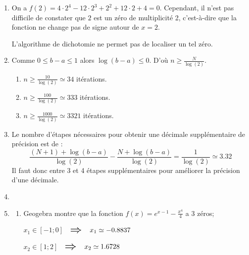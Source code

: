 \documentclass[11pt,a4paper,twoside]{report}
\begin{document}
\begin{enumerate}[label=R4.\arabic*, font=\bfseries, itemsep=8mm,labelsep*=4mm]
\item
On a $f(2)=4\cdot 2^4-12\cdot 2^3+2^2+12\cdot 2+4=0$.
Cependant, il n'est pas difficile de constater que $2$ est un zéro de multiplicité 2, c'est-à-dire que la fonction ne change pas de signe autour de $x=2$.

L'algorithme de dichotomie ne permet pas de localiser un tel zéro.






\item
Comme $0\leqslant b-a\leqslant 1$ alors $\log\left(b-a\right)\leqslant 0$. D'où $n\geqslant \frac{N}{\log(2)}$.
\begin{enumerate}[label=\roman*), itemsep=3mm]
\item $n\geqslant \frac{10}{\log(2)}\simeq 34$ itérations.
\item $n\geqslant \frac{100}{\log(2)}\simeq 333$ itérations.
\item $n\geqslant \frac{1000}{\log(2)}\simeq 3321$ itérations.
\end{enumerate}






\item
Le nombre d'étapes nécessaires pour obtenir une décimale supplémentaire de précision est de :
$$\frac{(N+1)+\log(b-a)}{\log(2)}-\frac{N+\log(b-a)}{\log(2)}=\frac{1}{\log(2)}\simeq 3.32$$
Il faut donc entre 3 et 4 étapes supplémentaires pour améliorer la précision d'une décimale.







\item
{}







\item
\begin{enumerate}[label=\roman*),itemsep=4mm]
\item Geogebra montre que la fonction $f(x)=e^{x-1}-\frac{x^4}{4}$  a 3 zéros;

\medskip
$x_1\in[-1;0]$  $\imply \eh{2} x_1\simeq -0.8837$%

\medskip
$x_2\in[1;2]$  $\imply \eh{2} x_2\simeq 1.6728$%


\end{enumerate}
\end{enumerate}
\end{document}
